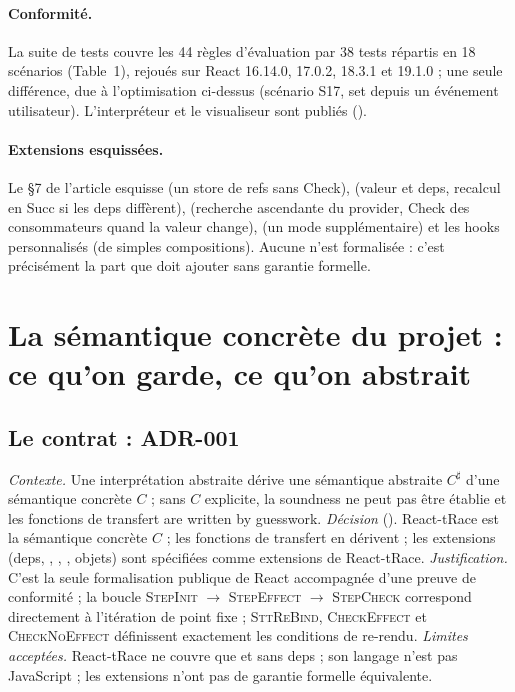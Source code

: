 \paragraph{Conformité.} La suite de tests couvre les 44 règles d'évaluation par
38 tests répartis en 18 scénarios (Table~1), rejoués sur React 16.14.0,
17.0.2, 18.3.1 et 19.1.0 ; une seule différence, due à l'optimisation
ci-dessus (scénario S17, set depuis un événement utilisateur). L'interpréteur
et le visualiseur sont publiés ().

\paragraph{Extensions esquissées.} Le §7 de l'article esquisse
 (un store de refs sans \textsf{Check}),  (valeur
et deps, recalcul en \textsf{Succ} si les deps diffèrent), 
(recherche ascendante du provider, \textsf{Check} des consommateurs quand la
valeur change),  (un mode supplémentaire) et les hooks
personnalisés (de simples compositions). Aucune n'est formalisée : c'est
précisément la part que \reactant{} doit ajouter sans garantie formelle.

\section{La sémantique concrète du projet : ce qu'on garde, ce qu'on abstrait}
\label{sec:react-modele-concrete}

\subsection{Le contrat : ADR-001}

\begin{decision}
\emph{Contexte.} Une interprétation abstraite dérive une sémantique abstraite
$C^\sharp$ d'une sémantique concrète $C$ ; sans $C$ explicite, la soundness ne
peut pas être établie et les fonctions de transfert \og are written by
guesswork\fg{}. \emph{Décision} (). React-tRace est la sémantique
concrète $C$ ; les fonctions de transfert en dérivent ; les extensions (deps,
, , , objets) sont spécifiées
comme extensions de React-tRace. \emph{Justification.} C'est la seule
formalisation publique de React accompagnée d'une preuve de conformité ; la
boucle \textsc{StepInit} $\to$ \textsc{StepEffect} $\to$ \textsc{StepCheck}
correspond directement à l'itération de point fixe ; \textsc{SttReBind},
\textsc{CheckEffect} et \textsc{CheckNoEffect} définissent exactement les
conditions de re-rendu. \emph{Limites acceptées.} React-tRace ne couvre que
 et  sans deps ; son langage n'est pas
JavaScript ; les extensions n'ont pas de garantie formelle équivalente.
\end{decision}

